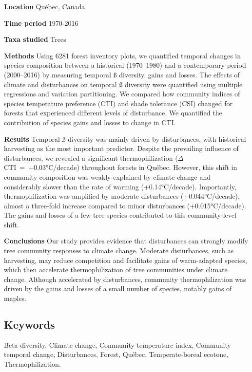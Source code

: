 \documentclass[
  a4paperpaper,
]{article}
\begin{document}
\textbf{Location} Québec, Canada

\textbf{Time period} 1970-2016

\textbf{Taxa studied} Trees

\textbf{Methods} Using 6281 forest inventory plots, we quantified
temporal changes in species composition between a historical
(1970--1980) and a contemporary period (2000--2016) by measuring
temporal ß diversity, gains and losses. The effects of climate and
disturbances on temporal ß diversity were quantified using multiple
regressions and variation partitioning. We compared how community
indices of species temperature preference (CTI) and shade tolerance
(CSI) changed for forests that experienced different levels of
disturbance. We quantified the contribution of species gains and losses
to change in CTI.

\textbf{Results} Temporal ß diversity was mainly driven by disturbances,
with historical harvesting as the most important predictor. Despite the
prevailing influence of disturbances, we revealed a significant
thermophilization (\(\Delta\)CTI~=~+0.03°C/decade) throughout forests in
Québec. However, this shift in community composition was weakly
explained by climate change and considerably slower than the rate of
warming (+0.14°C/decade). Importantly, thermophilization was amplified
by moderate disturbances (+0.044°C/decade), almost a three-fold increase
compared to minor disturbances (+0.015°C/decade). The gains and losses
of a few tree species contributed to this community-level shift.

\textbf{Conclusions} Our study provides evidence that disturbances can
strongly modify tree community responses to climate change. Moderate
disturbances, such as harvesting, may reduce competition and facilitate
gains of warm-adapted species, which then accelerate thermophilization
of tree communities under climate change. Although accelerated by
disturbances, community thermophilization was driven by the gains and
losses of a small number of species, notably gains of maples.

\hypertarget{keywords}{%
\subsection{Keywords}\label{keywords}}

Beta diversity, Climate change, Community temperature index, Community
temporal change, Disturbances, Forest, Québec, Temperate-boreal ecotone,
Thermophilization.

\pagebreak
\end{document}
